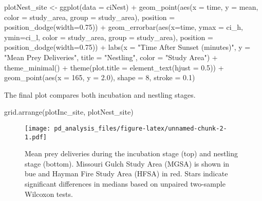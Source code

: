 \documentclass[
]{article}
\newenvironment{Shaded}{\begin{snugshade}}{\end{snugshade}}
\newcommand{\AttributeTok}[1]{\textcolor[rgb]{0.77,0.63,0.00}{#1}}
\newcommand{\DecValTok}[1]{\textcolor[rgb]{0.00,0.00,0.81}{#1}}
\newcommand{\FloatTok}[1]{\textcolor[rgb]{0.00,0.00,0.81}{#1}}
\newcommand{\FunctionTok}[1]{\textcolor[rgb]{0.00,0.00,0.00}{#1}}
\newcommand{\NormalTok}[1]{#1}
\newcommand{\OtherTok}[1]{\textcolor[rgb]{0.56,0.35,0.01}{#1}}
\newcommand{\SpecialCharTok}[1]{\textcolor[rgb]{0.00,0.00,0.00}{#1}}
\newcommand{\StringTok}[1]{\textcolor[rgb]{0.31,0.60,0.02}{#1}}
\begin{document}
\begin{Shaded}
\begin{Highlighting}[]
\NormalTok{plotNest\_site }\OtherTok{\textless{}{-}} \FunctionTok{ggplot}\NormalTok{(}\AttributeTok{data =}\NormalTok{ ciNest) }\SpecialCharTok{+}
  \FunctionTok{geom\_point}\NormalTok{(}\FunctionTok{aes}\NormalTok{(}\AttributeTok{x =}\NormalTok{ time, }\AttributeTok{y =}\NormalTok{ mean, }\AttributeTok{color =}\NormalTok{ study\_area, }\AttributeTok{group =}\NormalTok{ study\_area),}
             \AttributeTok{position =} \FunctionTok{position\_dodge}\NormalTok{(}\AttributeTok{width=}\FloatTok{0.75}\NormalTok{)) }\SpecialCharTok{+}
  \FunctionTok{geom\_errorbar}\NormalTok{(}\FunctionTok{aes}\NormalTok{(}\AttributeTok{x=}\NormalTok{time, }\AttributeTok{ymax =}\NormalTok{ ci\_h, }\AttributeTok{ymin=}\NormalTok{ci\_l, }\AttributeTok{color =}\NormalTok{ study\_area, }
                    \AttributeTok{group =}\NormalTok{ study\_area),}
                \AttributeTok{position =} \FunctionTok{position\_dodge}\NormalTok{(}\AttributeTok{width=}\FloatTok{0.75}\NormalTok{)) }\SpecialCharTok{+}
  \FunctionTok{labs}\NormalTok{(}\AttributeTok{x =} \StringTok{"Time After Sunset (minutes)"}\NormalTok{, }\AttributeTok{y =} \StringTok{"Mean Prey Deliveries"}\NormalTok{, }
       \AttributeTok{title =} \StringTok{"Nestling"}\NormalTok{, }\AttributeTok{color =} \StringTok{"Study Area"}\NormalTok{) }\SpecialCharTok{+}
  \FunctionTok{theme\_minimal}\NormalTok{() }\SpecialCharTok{+}
  \FunctionTok{theme}\NormalTok{(}\AttributeTok{plot.title =} \FunctionTok{element\_text}\NormalTok{(}\AttributeTok{hjust =} \FloatTok{0.5}\NormalTok{)) }\SpecialCharTok{+}
  \FunctionTok{geom\_point}\NormalTok{(}\FunctionTok{aes}\NormalTok{(}\AttributeTok{x =} \DecValTok{165}\NormalTok{, }\AttributeTok{y =} \FloatTok{2.0}\NormalTok{), }\AttributeTok{shape =} \DecValTok{8}\NormalTok{, }\AttributeTok{stroke =} \FloatTok{0.1}\NormalTok{)}
\end{Highlighting}
\end{Shaded}

The final plot compares both incubation and nestling stages.

\begin{Shaded}
\begin{Highlighting}[]
\FunctionTok{grid.arrange}\NormalTok{(plotInc\_site, plotNest\_site)}
\end{Highlighting}
\end{Shaded}

\begin{figure}
\centering
\texttt{[image: pd\_analysis\_files/figure-latex/unnamed-chunk-2-1.pdf]}
\caption{Mean prey deliveries during the incubation stage (top) and
nestling stage (bottom). Missouri Gulch Study Area (MGSA) is shown in
bue and Hayman Fire Study Area (HFSA) in red. Stars indicate significant
differences in medians based on unpaired two-sample Wilcoxon tests.}
\end{figure}

  
\end{document}
